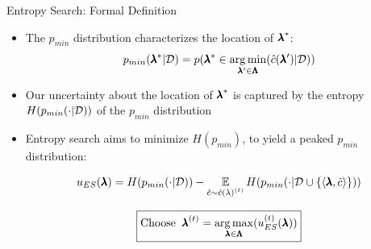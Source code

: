 \begin{frame}[c]{Entropy Search: Formal Definition}
\begin{itemize}

    \item The $p_{min}$ distribution characterizes the location of $\optconf$: \alert{\[p_{min}(\conf^*|\dataset) = p(\conf^* \in \argmin_{\conf' \in \pcs} (\surro(\conf') | \dataset))\]}
\smallskip
\fhpause
    \item Our uncertainty about the location of $\optconf$ is captured by the \alert{entropy $H( p_{min}(\cdot |\dataset))$ of the $p_{min}$ distribution}
\bigskip    
\fhpause
\item \alert{Entropy search aims to minimize $H(p_{min})$}, to yield a peaked $p_{min}$ distribution:
    
    \alert{\[u_{ES}(\conf) = H( p_{min}(\cdot |\dataset)) - \E_{\tilde{\cost} \sim \iter[\bocount]{\surro(\lambda)}} H( p_{min}(\cdot |\dataset \cup \left\{\left\langle\conf, \tilde{\cost} \right\rangle \right\})) \]}
    
    \[
    \boxed{\text{Choose}\;\;\bonextsample = \argmax_{\conf\in\pcs}(\iter{\acq}_{ES}(\conf))}
    \]
\end{itemize}

\end{frame}


